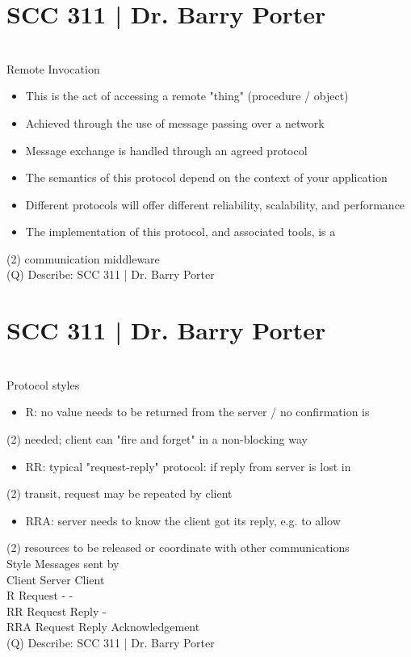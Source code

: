 \documentclass[12pt]{article}
\begin{document}
\section{SCC 311 | Dr. Barry Porter}
\\
Remote Invocation\\
\begin{itemize}
  \item This is the act of accessing a remote "thing" (procedure / object)
  \item Achieved through the use of message passing over a network
  \item Message exchange is handled through an agreed protocol
  \item The semantics of this protocol depend on the context of your application
  \item Different protocols will offer different reliability, scalability, and performance
  \item The implementation of this protocol, and associated tools, is a 
\end{itemize}(2)
communication middleware\\
\clearpage
(Q)
Describe: SCC 311 | Dr. Barry Porter
\clearpage
\section{SCC 311 | Dr. Barry Porter}
\\
Protocol styles\\
\begin{itemize}
  \item R: no value needs to be returned from the server / no confirmation is 
\end{itemize}(2)
needed; client can "fire and forget" in a non-blocking way\\
\begin{itemize}
  \item RR: typical "request-reply" protocol: if reply from server is lost in 
\end{itemize}(2)
transit, request may be repeated by client\\
\begin{itemize}
  \item RRA: server needs to know the client got its reply, e.g. to allow 
\end{itemize}(2)
resources to be released or coordinate with other communications\\
Style Messages sent by\\
Client Server Client\\
R Request - -\\
RR Request Reply -\\
RRA Request Reply Acknowledgement\\
\clearpage
(Q)
Describe: SCC 311 | Dr. Barry Porter
\clearpage
\end{document}
